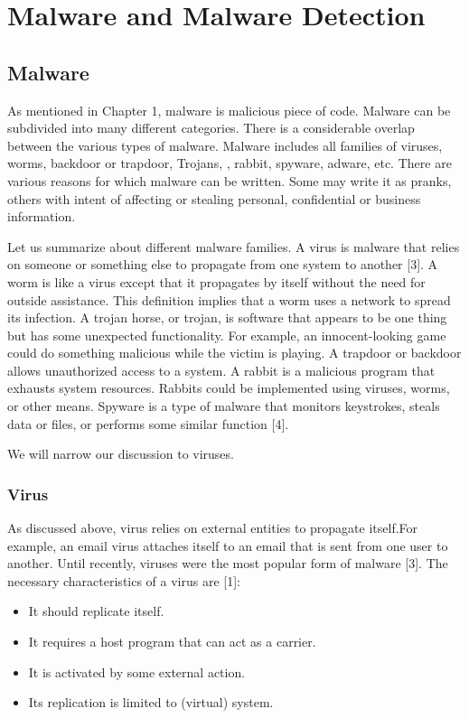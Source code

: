 \chapter{Malware and Malware Detection\label{chap:blah}}


\section{Malware}

As mentioned in Chapter 1, malware is malicious piece of code. Malware can be subdivided into many different categories. There is a considerable overlap between the various types of malware. Malware includes all families of viruses, worms, backdoor or trapdoor, Trojans, , rabbit, spyware, adware, etc. There are various reasons for which malware can be written. Some may write it as pranks, others with intent of affecting or stealing personal, confidential or business information.    

Let us summarize about different malware families. A virus is malware that relies on someone or something else to propagate from one system to another [3].  A worm is like a virus except that it propagates by itself without the need for outside assistance. This definition implies that a worm uses a network to spread its infection. A trojan horse, or trojan, is software that appears to be one thing but has some unexpected functionality. For example, an innocent-looking game could do something malicious while the victim is playing. A trapdoor or backdoor allows unauthorized access to a system. A rabbit is a malicious program that exhausts system resources. Rabbits could be implemented using viruses, worms, or other means. Spyware is a type of malware that monitors keystrokes, steals data or files, or performs some similar function [4].

We will narrow our discussion to viruses. 

\subsection{Virus}
As discussed above, virus relies on external entities to propagate itself.For example, an email virus attaches itself to an email that is sent from one user to another. Until recently, viruses were the most popular form of malware [3]. The necessary characteristics of a virus are [1]:
\begin{itemize}
\item It should replicate itself.
\item It requires a host program that can act as a carrier.
\item It is activated by some external action.
\item Its replication is limited to (virtual) system.
\end{itemize}

